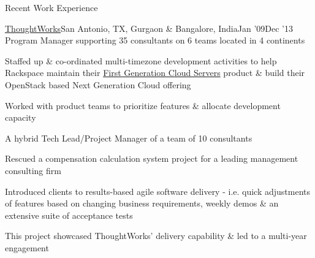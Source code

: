 \documentclass{resume} %
\begin{document}
\begin{rSection}{Recent Work Experience}
\begin{rSubsection}{\href{https://www.thoughtworks.com}{ThoughtWorks}}{San Antonio, TX, Gurgaon \& Bangalore, India}{Jan '09}{Dec '13}
    {Program Manager supporting 35 consultants on 6 teams located in 4 continents}

  \item Staffed up \& co-ordinated multi-timezone development activities to help Rackspace maintain their \href{https://techcrunch.com/2008/10/22/rackspace-acquires-jungledisk-slicehost-to-take-on-amazon-web-services/}{First Generation Cloud Servers} product \& build their OpenStack based Next Generation Cloud offering
    \item Worked with product teams to prioritize features \& allocate development capacity
\end{rSubsection}\vspace{-1em}


\begin{rSubsection}{}{}{}{}
  {A hybrid Tech Lead/Project Manager of a team of 10 consultants}

\item Rescued a compensation calculation system project for a leading management consulting firm
\item Introduced clients to results-based agile software delivery - i.e. quick
  adjustments of features based on changing business requirements, weekly demos \& an extensive suite of acceptance tests
\item This project showcased ThoughtWorks' delivery capability \& led to a multi-year engagement

\end{rSubsection}\vspace{-1em}



\end{rSection}
\end{document}
